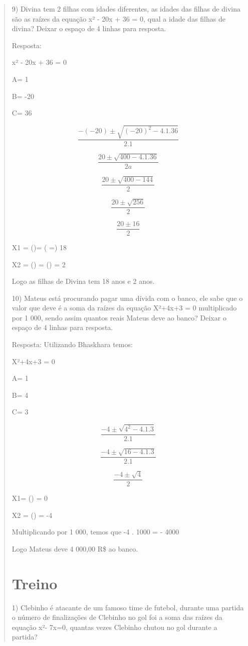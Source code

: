 \begin{quote}
\begin{escolha}
9) Divina tem 2 filhas com idades diferentes, as idades das filhas de
divina são as raízes da equação x² - 20x + 36 = 0, qual a idade das
filhas de divina? Deixar o espaço de 4 linhas para resposta.

Resposta:

x² - 20x + 36 = 0

A= 1

B= -20

C= 36

\[\frac{- ( - 20) \pm \sqrt{{( - 20)}^{2} - 4.1.36}}{2.1}\]

\[\frac{20 \pm \sqrt{400 - 4.1.36}}{2a}\]

\[\frac{20 \pm \sqrt{400 - 144}}{2}\]

\[\frac{20 \pm \sqrt{256}}{2}\]

\[\frac{20 \pm 16}{2}\]

X1 = ()= ( =) 18

X2 = () = () = 2

Logo as filhas de Divina tem 18 anos e 2 anos.

10) Mateus está procurando pagar uma dívida com o banco, ele sabe que o
valor que deve é a soma da raízes da equação X²+4x+3 = 0 multiplicado
por 1 000, sendo assim quantos reais Mateus deve ao banco? Deixar o
espaço de 4 linhas para resposta.

Resposta: Utilizando Bhaskhara temos:

X²+4x+3 = 0

A= 1

B= 4

C= 3

\[\frac{- 4 \pm \sqrt{4^{2} - 4.1.3}}{2.1}\]

\[\frac{- 4 \pm \sqrt{16 - 4.1.3}}{2.1}\]

\[\frac{- 4 \pm \sqrt{4}}{2}\]

X1= () = 0

X2 = () = -4

Multiplicando por 1 000, temos que -4 . 1000 = - 4000

Logo Mateus deve 4 000,00 R\$ ao banco.

\section{Treino}

1) Clebinho é atacante de um famoso time de futebol, durante uma partida
o número de finalizações de Clebinho no gol foi a soma das raízes da
equação x²- 7x=0, quantas vezes Clebinho chutou no gol durante a
partida?


\end{escolha}
\end{quote}
